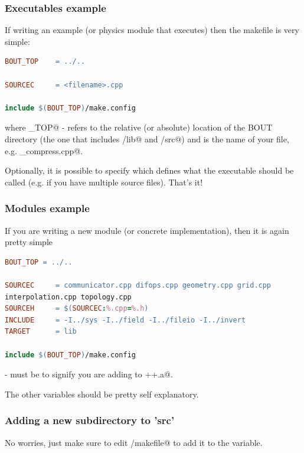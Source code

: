 \documentclass[12pt]{article}
\begin{document}
\subsubsection{Executables example}
%
\label{sec:executables}
%
If writing an example (or physics module that executes) then the makefile is
very simple:
%
\begin{lstlisting}[language=make,numbers=none]
BOUT_TOP	= ../..

SOURCEC		= <filename>.cpp

include $(BOUT_TOP)/make.config
\end{lstlisting}
%
where \verb@BOUT_TOP@ - refers to the relative (or absolute) location of the
BOUT directory (the one that includes \verb@/lib@ and \verb@/src@) and
\verb@SOURCEC@  is the name of your file, e.g. \verb@gas_compress.cpp@.

Optionally, it is possible to specify \verb@TARGET@ which defines what the
executable should be called (e.g. if you have multiple source files). That's
it!


\subsubsection{Modules example}
%
\label{sec:modules}
%
If you are writing a new module (or concrete implementation), then it is again
pretty simple
%
\begin{lstlisting}[language=make,numbers=none]
BOUT_TOP = ../..

SOURCEC		= communicator.cpp difops.cpp geometry.cpp grid.cpp
interpolation.cpp topology.cpp
SOURCEH		= $(SOURCEC:%.cpp=%.h)
INCLUDE		= -I../sys -I../field -I../fileio -I../invert
TARGET		= lib

include $(BOUT_TOP)/make.config
\end{lstlisting}
%
\verb@TARGET@ - must be \verb@lib@ to signify you are adding to
\verb@libbout++.a@.

The other variables should be pretty self explanatory.


\subsubsection{Adding a new subdirectory to 'src'}
%
No worries, just make sure to edit \verb@src/makefile@ to add it to the
\verb@DIRS@ variable.
\end{document}
